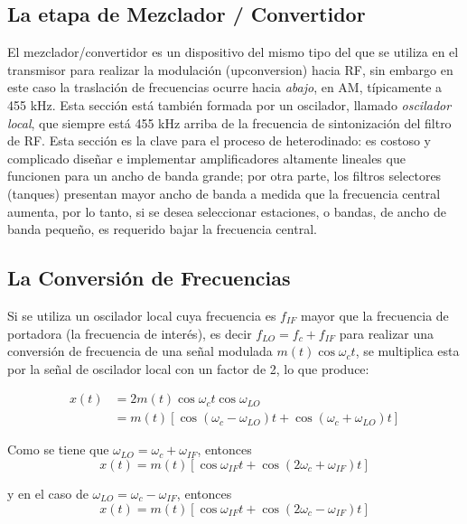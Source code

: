 \documentclass[12pt,letterpaper,titlepage,twoside]{book}
\begin{document}
\subsection{La etapa de Mezclador / Convertidor}
El mezclador/convertidor es un dispositivo del mismo tipo del que se utiliza en el transmisor para realizar la modulación (upconversion) hacia RF, sin embargo en este caso la traslación de frecuencias ocurre hacia \emph{abajo}, en AM, típicamente a 455 kHz. Esta sección está también formada por un oscilador, llamado \emph{oscilador local}, que siempre está 455 kHz arriba de la frecuencia de  sintonización del filtro de RF. Esta sección es la clave para el proceso de heterodinado: es costoso y complicado diseñar e implementar amplificadores altamente lineales que funcionen para un ancho de banda grande; por otra parte, los filtros selectores (tanques) presentan mayor ancho de banda a medida que la frecuencia central aumenta, por lo tanto, si se desea seleccionar estaciones, o bandas, de ancho de banda pequeño, es requerido bajar la frecuencia central.

\subsection{La Conversión de Frecuencias}
Si se utiliza un oscilador local cuya frecuencia es $f_{IF}$ mayor que la frecuencia de portadora (la frecuencia de interés), es decir $f_{LO}=f_{c}+f_{IF}$ para realizar una conversión de frecuencia de una señal modulada $m(t) \cos \omega_c t$, se multiplica esta por la señal de oscilador local con un factor de 2, lo que produce:

\begin{align}
 x(t) &= 2 m(t) \cos \omega_c t \cos \omega_{LO} \\
 &= m(t) \left[\cos \left( \omega_c -\omega_{LO}  \right) t+ \cos \left( \omega_c +\omega_{LO}  \right) t\right]
 \end{align} 

Como se tiene que  $\omega_{LO}=\omega_{c}+ \omega_{IF}$, entonces 
\begin{equation}
x(t) = m(t) \left[\cos  \omega_{IF}t+ \cos \left( 2 \omega_c +\omega_{IF}  \right) t\right]
\end{equation}
 
y en el caso de $\omega_{LO}=\omega_{c}- \omega_{IF}$, entonces 
\begin{equation}
x(t) = m(t) \left[\cos  \omega_{IF}t+ \cos \left( 2 \omega_c -\omega_{IF}  \right) t\right]
\end{equation}
 
\end{document}
